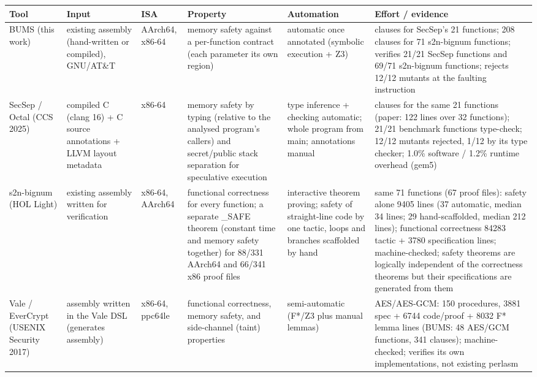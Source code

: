 \begin{tabularx}{\textwidth}{>{\raggedright}p{2.2cm}>{\raggedright}p{2.6cm}>{\raggedright}p{1.5cm}>{\raggedright}X>{\raggedright}p{2.4cm}>{\raggedright\arraybackslash}X}
\toprule
Tool & Input & ISA & Property & Automation & Effort / evidence\\
\midrule
BUMS (this work) & existing assembly (hand-written or compiled), GNU/AT\&T & AArch64, x86-64 & memory safety against a per-function contract (each parameter its own region) & automatic once annotated (symbolic execution + Z3) & 62 clauses for SecSep's 21 functions; 208 clauses for 71 s2n-bignum functions; verifies 21/21 SecSep functions and 69/71 s2n-bignum functions; rejects 12/12 mutants at the faulting instruction\\
SecSep / Octal (CCS 2025) & compiled C (clang 16) + C source annotations + LLVM layout metadata & x86-64 & memory safety by typing (relative to the analysed program's callers) and secret/public stack separation for speculative execution & type inference + checking automatic; whole program from main; annotations manual & 142 clauses for the same 21 functions (paper: 122 lines over 32 functions); 21/21 benchmark functions type-check; 12/12 mutants rejected, 1/12 by its type checker; 1.0\% software / 1.2\% runtime overhead (gem5)\\
s2n-bignum (HOL Light) & existing assembly written for verification & x86-64, AArch64 & functional correctness for every function; a separate \_SAFE theorem (constant time and memory safety together) for 88/331 AArch64 and 66/341 x86 proof files & interactive theorem proving; safety of straight-line code by one tactic, loops and branches scaffolded by hand & same 71 functions (67 proof files): safety alone 9405 lines (37 automatic, median 34 lines; 29 hand-scaffolded, median 212 lines); functional correctness 84283 tactic + 3780 specification lines; machine-checked; safety theorems are logically independent of the correctness theorems but their specifications are generated from them\\
Vale / EverCrypt (USENIX Security 2017) & assembly written in the Vale DSL (generates assembly) & x86-64, ppc64le & functional correctness, memory safety, and side-channel (taint) properties & semi-automatic (F*/Z3 plus manual lemmas) & AES/AES-GCM: 150 procedures, 3881 spec + 6744 code/proof + 8032 F* lemma lines (BUMS: 48 AES/GCM functions, 341 clauses); machine-checked; verifies its own implementations, not existing perlasm\\

\end{tabularx}
